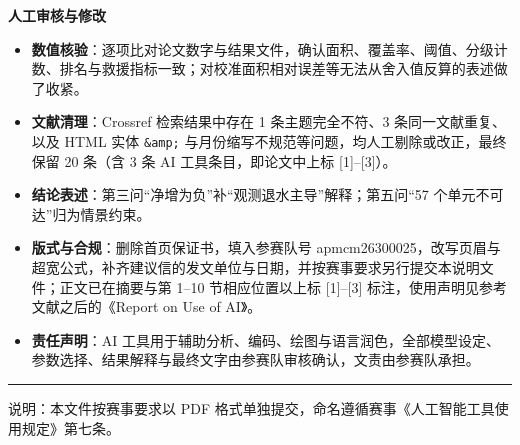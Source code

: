\documentclass[11pt,a4paper]{ctexart}
\begin{document}
\textbf{人工审核与修改}
\begin{itemize}
\item \textbf{数值核验}：逐项比对论文数字与结果文件，确认面积、覆盖率、阈值、分级计数、排名与救援指标一致；对校准面积相对误差等无法从舍入值反算的表述做了收紧。
\item \textbf{文献清理}：Crossref 检索结果中存在 1 条主题完全不符、3 条同一文献重复、以及 HTML 实体 \texttt{\&amp;} 与月份缩写不规范等问题，均人工剔除或改正，最终保留 20 条（含 3 条 AI 工具条目，即论文中上标 [1]--[3]）。
\item \textbf{结论表述}：第三问“净增为负”补“观测退水主导”解释；第五问“57 个单元不可达”归为情景约束。
\item \textbf{版式与合规}：删除首页保证书，填入参赛队号 apmcm26300025，改写页眉与超宽公式，补齐建议信的发文单位与日期，并按赛事要求另行提交本说明文件；正文已在摘要与第 1--10 节相应位置以上标 [1]--[3] 标注，使用声明见参考文献之后的《Report on Use of AI》。
\item \textbf{责任声明}：AI 工具用于辅助分析、编码、绘图与语言润色，全部模型设定、参数选择、结果解释与最终文字由参赛队审核确认，文责由参赛队承担。
\end{itemize}

\vspace{8pt}
\hrule
\vspace{6pt}
{\small 说明：本文件按赛事要求以 PDF 格式单独提交，命名遵循赛事《人工智能工具使用规定》第七条。}
\end{document}
